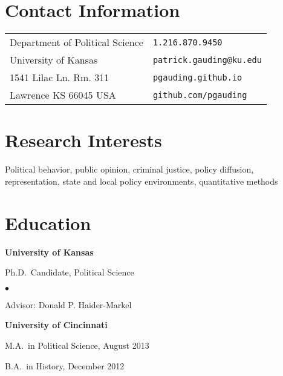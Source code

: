 \documentclass[margin,line,pifont,palatino,courier]{res}
\newenvironment{list1}{
  \begin{list}{\ding{113}}{%
      \setlength{\itemsep}{0in}
      \setlength{\parsep}{0in} \setlength{\parskip}{0in}
      \setlength{\topsep}{0in} \setlength{\partopsep}{0in}
      \setlength{\leftmargin}{0.17in}}}{\end{list}}
\newenvironment{list2}{
  \begin{list}{$\bullet$}{%
      \setlength{\itemsep}{0in}
      \setlength{\parsep}{0in} \setlength{\parskip}{0in}
      \setlength{\topsep}{0in} \setlength{\partopsep}{0in}
      \setlength{\leftmargin}{0.2in}}}{\end{list}}
\begin{document}

\begin{resume}

\section{\sc Contact Information}

\vspace{.05in}
\begin{tabular}{@{}p{2.75in}p{2in}}
Department of Political Science & \verb+1.216.870.9450+ \\
University of Kansas            & \verb+patrick.gauding@ku.edu+\\
1541 Lilac Ln. Rm. 311          & \verb+pgauding.github.io+\\
Lawrence KS 66045 USA           & \verb+github.com/pgauding+\\
\end{tabular}

\section{\sc Research Interests}
Political behavior, public opinion, criminal justice, policy diffusion, representation, state and local policy environments, quantitative methods

\section{\sc Education}

{\bf University of Kansas}\\
\begin{list1}
\item[] Ph.D.~Candidate, Political Science %

\begin{list2}
\vspace*{.05in}
\item Advisor: Donald P. Haider-Markel
\end{list2}
\end{list1}

{\bf University of Cincinnati}\\
\begin{list1}
\item[] M.A.~in Political Science, August 2013
\item[] B.A.~in History, December 2012


\end{list1}
\end{resume}
\end{document}
